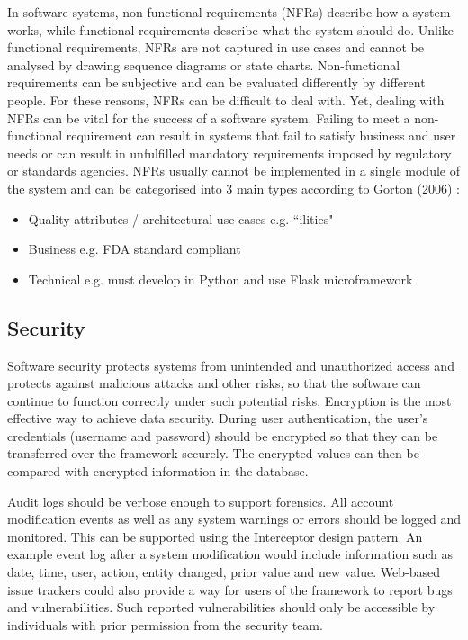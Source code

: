 In software systems, non-functional requirements (NFRs) describe how a system works, while functional requirements describe what the system should do. Unlike functional requirements, NFRs are not captured in use cases and cannot be analysed by drawing sequence diagrams or state charts. Non-functional requirements can be subjective and can be evaluated differently by different people. For these reasons, NFRs can be difficult to deal with. Yet, dealing with NFRs can be vital for the success of a software system. \cite{nfrs} Failing to meet a non-functional requirement can result in systems that fail to satisfy business and user needs or can result in unfulfilled mandatory requirements imposed by regulatory or standards agencies. NFRs usually cannot be implemented in a single module of the system and can be categorised into 3 main types according to Gorton (2006) \cite{sw-arch}:
\begin{itemize}
  \item Quality attributes / architectural use cases e.g. ``ilities"
  \item Business e.g. FDA standard compliant
  \item Technical e.g. must develop in Python and use Flask microframework
\end{itemize}

\subsection{Security}
Software security protects systems from unintended and unauthorized access and protects against malicious attacks and other risks, so that the software can continue to function correctly under such potential risks. Encryption is the most effective way to achieve data security. During user authentication, the user's credentials (username and password) should be encrypted so that they can be transferred over the framework securely. The encrypted values can then be compared with encrypted information in the database.

Audit logs should be verbose enough to support forensics. All account modification events as well as any system warnings or errors should be logged and monitored. This can be supported using the Interceptor design pattern. An example event log after a system modification would include information such as date, time, user, action, entity changed, prior value and new value. Web-based issue trackers could also provide a way for users of the framework to report bugs and vulnerabilities. Such reported vulnerabilities should only be accessible by individuals with prior permission from the security team.

